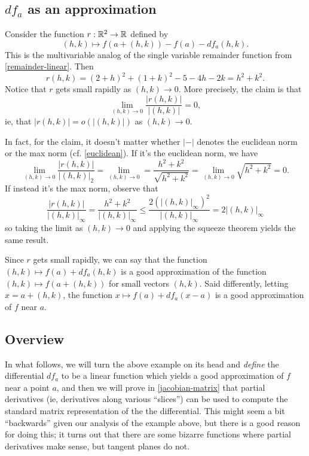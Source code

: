 \subsection*{\texorpdfstring{$df_a$}{dfa} as an approximation}

Consider the function $r : \mathbb{R}^2 \to \mathbb{R}$ defined by
\[ (h,k) \mapsto f(a+(h,k))-f(a)-df_a(h,k).  \]
This is the multivariable analog of the single variable remainder function from \cref{remainder-linear}. Then
\[ r(h,k) = (2+h)^2 + (1+k)^2 - 5 - 4h - 2k = h^2 + k^2. \]
Notice that $r$ gets small rapidly as $(h,k) \to 0$. More precisely, the claim is that
\[ \lim_{(h,k) \to 0} \frac{|r(h,k)|}{|(h,k)|} = 0, \]
ie, that $|r(h,k)| = o(|(h,k)|)$ as $(h,k) \to 0$. 

In fact, for the claim, it doesn't matter whether $|-|$ denotes the euclidean norm or the max norm (cf. \cref{euclidean}). If it's the euclidean norm, we have
\[ \lim_{(h,k) \to 0} \frac{|r(h,k)|}{|(h,k)|_2} = \lim_{(h,k) \to 0} = \frac{h^2 + k^2}{\sqrt{h^2 + k^2}} = \lim_{(h,k) \to 0} \sqrt{h^2 + k^2} = 0. \]
If instead it's the max norm, observe that
\[ \frac{|r(h,k)|}{|(h,k)|_\infty} = \frac{h^2 + k^2}{|(h,k)|_\infty} \leq \frac{2(|(h,k)|_\infty)^2}{|(h,k)|_\infty} = 2|(h,k)|_\infty \]
so taking the limit as $(h,k) \to 0$ and applying the squeeze theorem yields the same result. 

Since $r$ gets small rapidly, we can say that the function $(h,k) \mapsto f(a) + df_a(h,k)$ is a good approximation of the function $(h,k) \mapsto f(a+(h,k))$ for small vectors $(h,k)$. Said differently, letting $x = a + (h,k)$, the function $x \mapsto f(a) + df_a(x-a)$ is a good approximation of $f$ near $a$. 

\subsection*{Overview}

In what follows, we will turn the above example on its head and \emph{define} the differential $df_a$ to be a linear function which yields a good approximation of $f$ near a point $a$, and then we will prove in \cref{jacobian-matrix} that partial derivatives (ie, derivatives along various ``slices'') can be used to compute the standard matrix representation of the the differential. This might seem a bit ``backwards'' given our analysis of the example above, but there is a good reason for doing this; it turns out that there are some bizarre functions where partial derivatives make sense, but tangent planes do not.

